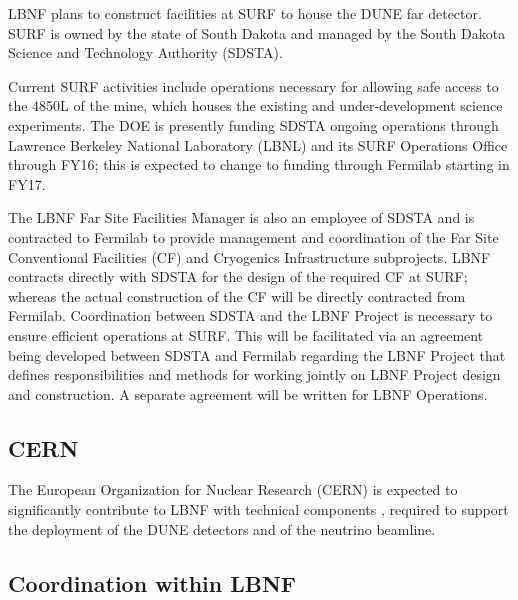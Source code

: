 LBNF plans to construct facilities at SURF to house the DUNE far detector. SURF is owned by the state of South Dakota and managed by the South Dakota Science and Technology Authority (SDSTA). 

Current SURF activities include operations necessary for allowing safe access to the 4850L of the mine, which houses the existing and under-development science experiments. The DOE is presently funding SDSTA ongoing operations through Lawrence Berkeley National Laboratory (LBNL) and its SURF Operations Office through FY16; this is expected to change to funding through Fermilab starting in FY17. 

The LBNF Far Site Facilities Manager is also an employee of SDSTA and is contracted to Fermilab to provide management and coordination of the Far Site Conventional Facilities (CF) and Cryogenics Infrastructure subprojects. LBNF contracts directly with SDSTA for the design of the required CF at SURF; whereas the actual construction of the CF will be directly contracted from Fermilab. Coordination between SDSTA and the LBNF Project is necessary to ensure efficient operations at SURF. This will be facilitated via an agreement being developed between SDSTA and Fermilab regarding the LBNF Project  that defines responsibilities and methods for working jointly on LBNF Project design and construction. A separate agreement will be written for LBNF Operations. 

\subsection{CERN}

The European Organization for Nuclear Research (CERN) is expected to significantly contribute to LBNF with technical components , required to support the deployment of the DUNE detectors and of the neutrino beamline. 

\subsection{Coordination within LBNF}

